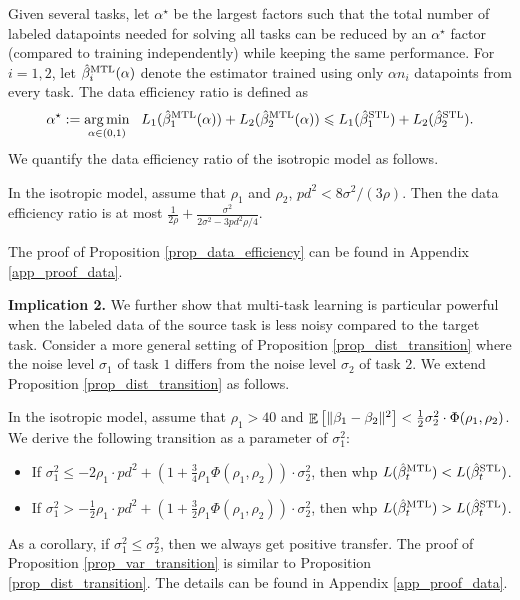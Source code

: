 Given several tasks, let $\alpha^{\star}$ be the largest factors such that the total number of labeled datapoints needed for solving all tasks can be reduced by an $\alpha^{\star}$ factor (compared to training independently) while keeping the same performance.
For $i = 1, 2$, let $\hat{\beta}_i^{\text{MTL}}(\alpha)$ denote the estimator trained using only $\alpha n_i$ datapoints from every task.
The data efficiency ratio is defined as
\[ \alpha^{\star} :=\operatorname*{arg\,min}_{\alpha\in(0, 1)} ~~
		L_1(\hat{\beta}_1^{\text{MTL}}(\alpha)) + L_2(\hat{\beta}_2^{\text{MTL}}(\alpha))
		\leqslant L_1(\hat{\beta}_1^{\text{STL}}) + L_2(\hat{\beta}_2^{\text{STL}}). \]
We quantify the data efficiency ratio of the isotropic model as follows.

\begin{proposition}\label{prop_data_efficiency}
	In the isotropic model, assume that $\rho_1$ and $\rho_2$, $pd^2 < {8\sigma^2} /{(3 \rho)}$.
	Then the data efficiency ratio is at most $\frac{1}{2\rho} + \frac{\sigma^2}{2\sigma^2 - 3p d^2 \rho / 4}$.
\end{proposition}
The proof of Proposition \ref{prop_data_efficiency} can be found in Appendix \ref{app_proof_data}.

\textbf{Implication 2.}
We further show that multi-task learning is particular powerful when the labeled data of the source task is less noisy compared to the target task.
Consider a more general setting of Proposition \ref{prop_dist_transition} where the noise level $\sigma_1$ of task $1$ differs from the noise level $\sigma_2$ of task $2$.
We extend Proposition \ref{prop_dist_transition} as follows.

\begin{proposition}\label{prop_var_transition}
	In the isotropic model, assume that $\rho_1 > 40$ and $\mathop{\mathbb{E}}\left[ \|\beta_1 - \beta_2\|^2 \right]< \frac{1}{2} {\sigma_2^2}  \cdot \Phi(\rho_1, \rho_2)$.
	We derive the following transition as a parameter of $\sigma_1^2$:
	\begin{itemize}
		\item If $\sigma_1^2 \le -2 \rho_1 \cdot p d^2+\left(1+ \frac34\rho_1 \Phi(\rho_1, \rho_2)\right)\cdot\sigma_2^2$, then whp $L(\hat{\beta}_t^{\text{MTL}}) < L(\hat{\beta}_t^{\text{STL}})$.
		\item If $\sigma_1^2 > - \frac12\rho_1\cdot p d^2   +\left(1+ \frac32\rho_1\Phi(\rho_1, \rho_2)\right) \cdot \sigma_2^2$, then whp $L(\hat{\beta}_t^{\text{MTL}}) > L(\hat{\beta}_t^{\text{STL}})$.
	\end{itemize}
\end{proposition}
As a corollary, if $\sigma_1^2 \le \sigma_2^2$, then we always get positive transfer.
The proof of Proposition \ref{prop_var_transition} is similar to Proposition \ref{prop_dist_transition}.
The details can be found in Appendix \ref{app_proof_data}.



